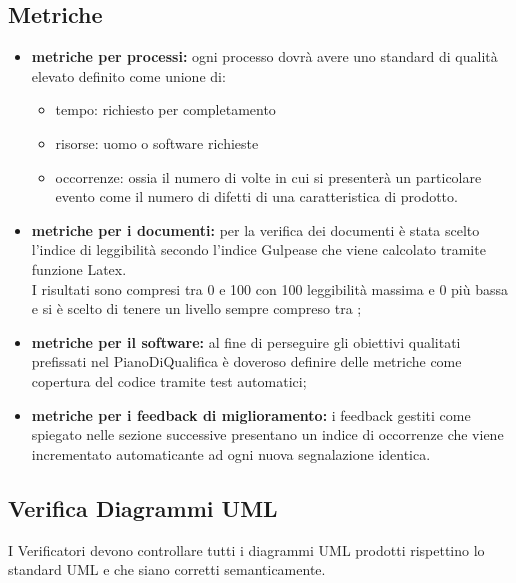\documentclass[NormeDiProgetto.tex]{subfiles}
\begin{document}
	\subsection{Metriche}
	\begin{itemize}
		\item \textbf{metriche per processi:} ogni processo dovrà avere uno standard di qualità elevato definito come unione di:
		\begin{itemize}
			\item tempo: richiesto per completamento
			\item risorse: uomo o software richieste
			\item occorrenze: ossia il numero di volte in cui si presenterà un particolare evento come il numero di difetti di una caratteristica di prodotto. 
		\end{itemize} 
		
		\item \textbf{metriche per i documenti:} per la verifica dei documenti è stata scelto l'indice di leggibilità secondo l'indice Gulpease che viene calcolato tramite funzione Latex.\\I risultati sono compresi tra 0 e 100 con 100 leggibilità massima e 0 più bassa e si è scelto di tenere un livello sempre compreso tra ;%
		 
		\item \textbf{metriche per il software:} al fine di perseguire gli obiettivi qualitati prefissati nel PianoDiQualifica è doveroso definire delle metriche come copertura del codice tramite test automatici; %
		\item \textbf{metriche per i feedback di miglioramento:} i feedback gestiti come spiegato nelle sezione successive presentano un indice di occorrenze che viene incrementato automaticante ad ogni nuova segnalazione identica. 
	\end{itemize}
	
	\subsection{Verifica Diagrammi UML}
	I Verificatori devono controllare tutti i diagrammi UML prodotti rispettino lo standard UML e che siano corretti semanticamente.
	
	
\end{document}
